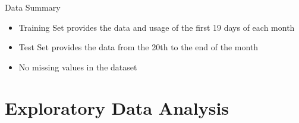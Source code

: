 \documentclass[
 size=14pt,
 paper=smartboard,  %
 mode=present, 		%
 display=slides, 	%
 style=tuliplab,  	%
 pauseslide,
 fleqn,leqno]{powerdot}
\begin{document}
\begin{slide}[toc=,bm=]{Data Summary}
  \begin{itemize}
    \item  Training Set provides the data and usage of the first 19 days of each month
    \item Test Set provides the data from the 20th to the end of the month
  \end{itemize}
  \bigskip
  \begin{itemize}
   
     \item No missing values in the dataset
    
    \end{itemize}
  \bigskip
  
  \end{slide}

\section{Exploratory Data Analysis}
\end{document}
